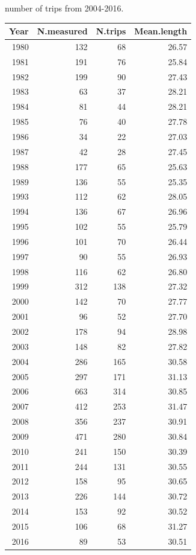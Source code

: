 \documentclass[12pt,]{article}
\begin{document}
\begin{table}[ht]
{                                            number of trips from 2004-2016.} 
\label{tab:Fleet4_lengthsample}
\begin{tabular}{rrrr}
  \hline
Year & N.measured & N.trips & Mean.length \\ 
  \hline
1980 & 132 &  68 & 26.57 \\ 
  1981 & 191 &  76 & 25.84 \\ 
  1982 & 199 &  90 & 27.43 \\ 
  1983 &  63 &  37 & 28.21 \\ 
  1984 &  81 &  44 & 28.21 \\ 
  1985 &  76 &  40 & 27.78 \\ 
  1986 &  34 &  22 & 27.03 \\ 
  1987 &  42 &  28 & 27.45 \\ 
  1988 & 177 &  65 & 25.63 \\ 
  1989 & 136 &  55 & 25.35 \\ 
  1993 & 112 &  62 & 28.05 \\ 
  1994 & 136 &  67 & 26.96 \\ 
  1995 & 102 &  55 & 25.79 \\ 
  1996 & 101 &  70 & 26.44 \\ 
  1997 &  90 &  55 & 26.93 \\ 
  1998 & 116 &  62 & 26.80 \\ 
  1999 & 312 & 138 & 27.32 \\ 
  2000 & 142 &  70 & 27.77 \\ 
  2001 &  96 &  52 & 27.70 \\ 
  2002 & 178 &  94 & 28.98 \\ 
  2003 & 148 &  82 & 27.82 \\ 
  2004 & 286 & 165 & 30.58 \\ 
  2005 & 297 & 171 & 31.13 \\ 
  2006 & 663 & 314 & 30.85 \\ 
  2007 & 412 & 253 & 31.47 \\ 
  2008 & 356 & 237 & 30.91 \\ 
  2009 & 471 & 280 & 30.84 \\ 
  2010 & 241 & 150 & 30.39 \\ 
  2011 & 244 & 131 & 30.55 \\ 
  2012 & 158 &  95 & 30.65 \\ 
  2013 & 226 & 144 & 30.72 \\ 
  2014 & 153 &  92 & 30.52 \\ 
  2015 & 106 &  68 & 31.27 \\ 
  2016 &  89 &  53 & 30.51 \\ 
   \hline
\end{tabular}
\end{table}
\end{document}
